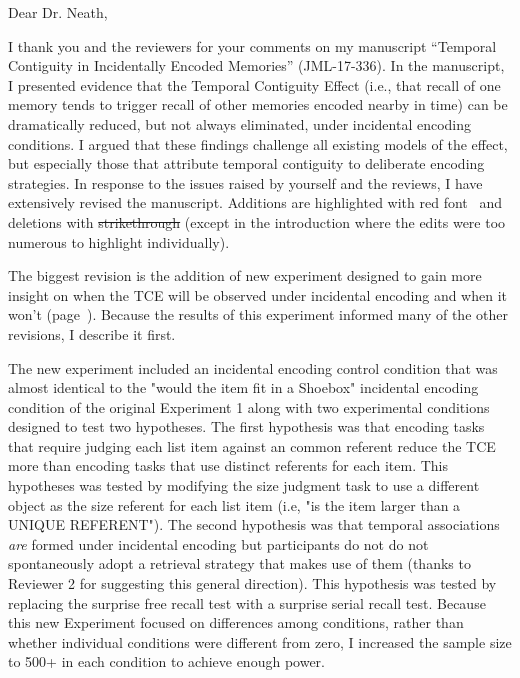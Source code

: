 \documentclass[12pt]{article}
\begin{document}
Dear Dr. Neath,
 

I thank you and the reviewers for your comments on my manuscript  ``Temporal Contiguity in Incidentally Encoded Memories'' (JML-17-336). In the manuscript, I presented evidence that the Temporal Contiguity Effect (i.e., that recall of one memory tends to trigger recall of other memories encoded nearby in time) can be dramatically reduced, but not always eliminated, under incidental encoding conditions. I argued that these findings challenge all existing models of the effect, but especially those that attribute temporal contiguity to deliberate encoding strategies. In response to the issues raised by yourself and the reviews, I have extensively revised the manuscript. Additions are highlighted with   \color{red}red font\color{black}~ and deletions with \st{strikethrough} (except in the introduction where the edits were too numerous to highlight individually).


The biggest revision is the addition of new experiment designed to gain more insight on when the TCE will be observed under incidental encoding and when it won't (page~\pageref{newexp}). Because the results of this experiment informed many of the other revisions, I describe it first.

The new experiment included an incidental encoding control condition that was almost identical to the "would the item fit in a Shoebox" incidental encoding condition of the original Experiment 1 along with two experimental conditions designed to test two hypotheses. The first hypothesis was that encoding tasks that require judging each list item against an common referent reduce the TCE more than encoding tasks that use distinct referents for each item. This hypotheses was tested by modifying the size judgment task to use a different object as the size referent for each list item (i.e, "is the item larger than a UNIQUE REFERENT"). The second hypothesis was that temporal associations \emph{are} formed under incidental encoding but participants do not do not spontaneously adopt a retrieval strategy that makes use of them (thanks to Reviewer 2 for suggesting this general direction). This hypothesis was tested by replacing the surprise free recall test with a surprise serial recall test. Because this new Experiment focused on differences among conditions, rather than whether individual conditions were different from zero, I increased the sample size to 500+ in each condition to achieve enough power.
\end{document}
